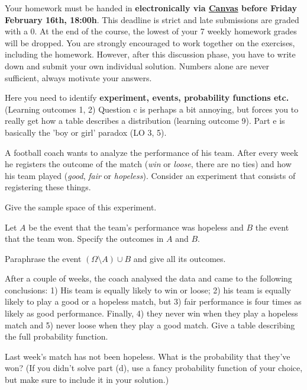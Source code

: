 \documentclass[a4paper,10pt,landscape,twocolumn]{scrartcl}
\newcommand\deadline{Friday February 16th, 18:00h}
\begin{document}
\homeworkproblems

{\sffamily\noindent
Your homework must be handed in \textbf{electronically via \href{\canvasURL}{Canvas} before \deadline}. 
This deadline is strict and late submissions are graded with a 0. At the end of the course, the lowest of your 7 weekly homework grades will be dropped. You are strongly encouraged to work together on the exercises, including the homework. However, after this discussion phase, you have to write down and submit your own individual solution. Numbers alone are never sufficient, always motivate your answers.
}



\begin{exercise}[Football (4pt)]
	\begin{mycomment}
	Here you need to identify \textbf{experiment, events, probability functions etc.} (Learning outcomes 1, 2) Question c is perhaps a bit annoying, but forces you to really get how a table describes a distribution (learning outcome 9). Part e is basically the 'boy or girl' paradox (LO 3, 5). 
	\end{mycomment}
	
	 A football coach wants to analyze the performance of his team. After every week he registers the outcome of the match (\emph{win} or \emph{loose}, there are no ties) and how his team played (\emph{good}, \emph{fair} or \emph{hopeless}). Consider an experiment that consists of registering these things.
	
	\begin{subex}[0.5pt]
		Give the sample space of this experiment.	
	\end{subex}
	
	\begin{subex}[0.5pt]
		Let $A$ be the event that the team's performance was hopeless and $B$ the event that the team won. Specify the outcomes in $A$ and $B$.
	\end{subex}

	\begin{subex}[1pt]
		Paraphrase the event $(\Omega \setminus A) \cup B$ and give all its outcomes.	
	\end{subex}
	
	\begin{subex}[1pt]
	After a couple of weeks, the coach analysed the data and came to the following conclusions: 1) His team is equally likely to win or loose; 2) his team is equally likely to play a good or a hopeless match, but 3)  fair performance is four times as likely as good performance. Finally, 4) they never win when they play a hopeless match and 5) never loose when they play a good match. Give a table describing the full probability function.
	\end{subex}

	\begin{subex}[1pt]
		Last week's match has not been hopeless. What is the probability that they've won? (If you didn't solve part (d), use a fancy probability function of your choice, but make sure to include it in your solution.)
	\end{subex}


\end{exercise}
\end{document}
